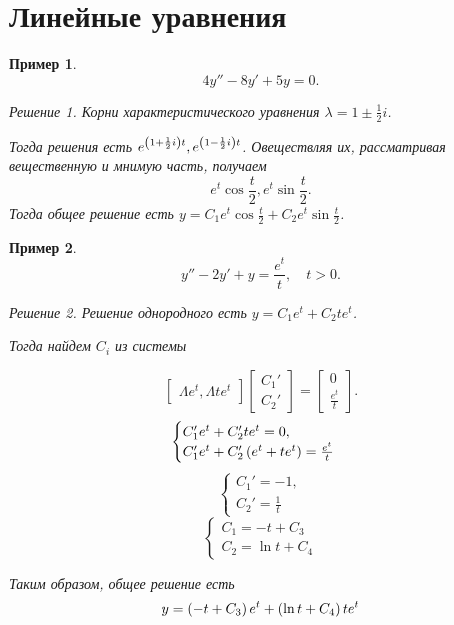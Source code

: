 \documentclass[a5paper, 11pt]{article}
\theoremstyle{definition}
\theoremstyle{plain}
\newtheorem{Ex}{Пример}
\theoremstyle{remark}
\newtheorem*{Solution}{Решение}
\begin{document}
	\section[03.03.2023]{Линейные уравнения}
	\begin{Ex}
		\[
		4y''-8y'+5y=0.
		\]
		\begin{Solution}
			Корни характеристического уравнения $\lambda = 1 \pm \frac12 i$.
			
			Тогда решения есть $e^{\left(1 + \frac12 i\right)t}, e^{\left(1 - \frac12 i\right)t}$. Овеществляя их, рассматривая вещественную и мнимую часть, получаем
			\[
			e^{t}\cos \frac t2, e^t \sin \frac t2.
			\]
			Тогда общее решение есть $y = C_1e^{t}\cos \frac t2 + C_2 e^t \sin \frac t2$.
		\end{Solution}
	\end{Ex}
	\begin{Ex}
		\[
		y'' - 2y' + y = \frac{e^t}{t}, \quad t>0.
		\]
		\begin{Solution}
			Решение однородного есть $y = C_1 e^t + C_2 t e^t$.
			
			Тогда найдем $C_i$ из системы
			
			\[
			\begin{bmatrix}
				\Lambda e^t, \Lambda te^t
			\end{bmatrix}
			\begin{bmatrix}
				C_1'\\C_2'
			\end{bmatrix}
			=
			\begin{bmatrix}
				0\\\frac{e^t}{t}
			\end{bmatrix}.
			\]
			\[
			\begin{cases}
				C_1'e^t + C_2'te^t=0,\\
				C_1' e^t + C_2' \left(e^t+te^t\right) = \frac{e^t}{t}
			\end{cases}
			\]
			\[
			\begin{cases}
				C_1' = -1,\\
				C_2' = \frac{1}{t}
			\end{cases}
			\]
			\[
			\begin{cases}
				C_1 = -t + C_3\\
				C_2 = \ln t + C_4
			\end{cases}
			\]
			
			Таким образом, общее решение есть 
			\[
			y = \left(-t + C_3\right) e^t + \left(\ln t + C_4\right) t e^t
			\]
		\end{Solution}
	\end{Ex}
\end{document}
